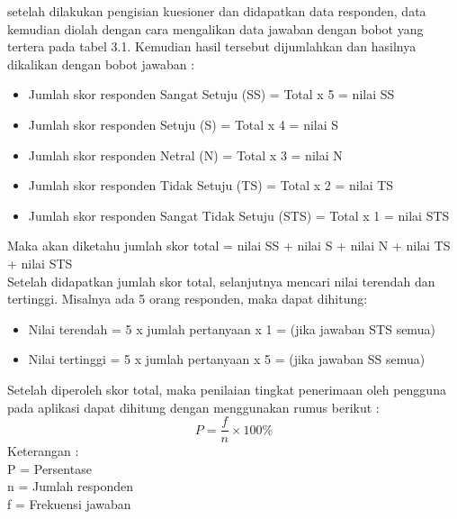 \begin{flushleft}
\begin{justify}
\begin{table}[ht]
\begin{tabular}{|>{\raggedright}p{5cm}|p{2.5cm}|>{\raggedright}p{5cm}|}
             \tabularnewline
           \hline
          \end{tabular}
         \end{table}
         \newline setelah dilakukan pengisian kuesioner dan didapatkan data responden, data kemudian diolah dengan cara mengalikan data jawaban dengan bobot yang tertera pada tabel 3.1. Kemudian hasil tersebut dijumlahkan dan hasilnya dikalikan dengan bobot jawaban :
         \begin{itemize}
            \item Jumlah skor responden Sangat Setuju (SS)  = Total x 5 = nilai SS
            \item Jumlah skor responden Setuju (S)  = Total x 4 = nilai S
            \item Jumlah skor responden Netral (N)  = Total x 3 = nilai N
            \item Jumlah skor responden Tidak Setuju (TS)  = Total x 2 = nilai TS
            \item Jumlah skor responden Sangat Tidak Setuju (STS)  = Total x 1 = nilai STS
         \end{itemize}
         Maka akan diketahu jumlah skor total = nilai SS + nilai S + nilai N + nilai TS + nilai STS
         \\\newline Setelah didapatkan jumlah skor total, selanjutnya mencari nilai terendah dan tertinggi. Misalnya ada 5 orang responden, maka dapat dihitung:
         \begin{itemize}
            \item Nilai terendah = 5 x jumlah pertanyaan x 1 = (jika jawaban STS semua)
            \item Nilai tertinggi = 5 x jumlah pertanyaan x 5 = (jika jawaban SS semua)
         \end{itemize}
         \noindent Setelah diperoleh skor total, maka penilaian tingkat penerimaan oleh pengguna pada aplikasi dapat dihitung dengan menggunakan rumus berikut \cite{kuantitatif}:
         \begin{equation}
            P = \frac{f}{n} \times 100\%
         \end{equation}
         \noindent Keterangan :
         \\P = Persentase
         \\n = Jumlah responden
         \\f = Frekuensi jawaban\\


\end{justify}
\end{flushleft}
